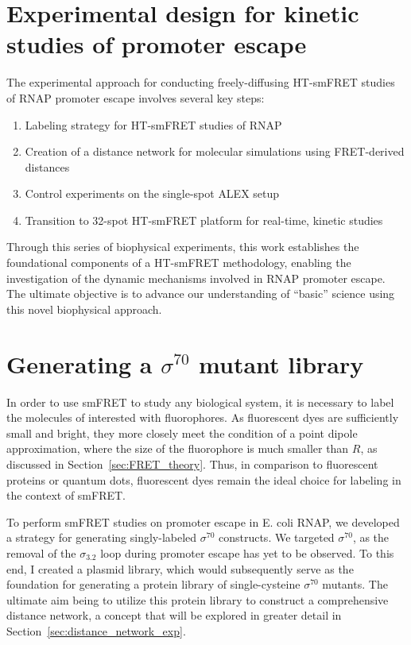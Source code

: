 \section{Experimental design for kinetic studies of promoter escape}
\label{sec:promoter_escape_exp}

The experimental approach for conducting freely-diffusing \ac{HT-smFRET} studies of \ac{RNAP} promoter escape involves several key steps:

\begin{enumerate}
    \item Labeling strategy for \ac{HT-smFRET} studies of \ac{RNAP}
    \item Creation of a distance network for molecular simulations using FRET-derived distances
    \item Control experiments on the single-spot \ac{ALEX} setup
    \item Transition to 32-spot \ac{HT-smFRET} platform for real-time, kinetic studies
\end{enumerate}

Through this series of biophysical experiments, this work establishes the foundational components of a \ac{HT-smFRET} methodology, enabling the investigation of the dynamic mechanisms involved in \ac{RNAP} promoter escape. 
The ultimate objective is to advance our understanding of \enquote{basic} science using this novel biophysical approach.

\section{Generating a $\sigma^{70}$ mutant library}
\label{sec:sigma70_library_exp}

In order to use \ac{smFRET} to study any biological system, it is necessary to label the molecules of interested with fluorophores.
As fluorescent dyes are sufficiently small and bright, they more closely meet the condition of a point dipole approximation, where the size of the fluorophore is much smaller than $R$, as discussed in Section~\ref{sec:FRET_theory}.
Thus, in comparison to fluorescent proteins or quantum dots, fluorescent dyes remain the ideal choice for labeling in the context of \ac{smFRET}.

To perform \ac{smFRET} studies on promoter escape in \ac{E. coli} \ac{RNAP}, we developed a strategy for generating singly-labeled $\sigma^{70}$ constructs. 
We targeted $\sigma^{70}$, as the removal of the $\sigma_{3.2}$ loop during promoter escape has yet to be observed. 
To this end, I created a plasmid library, which would subsequently serve as the foundation for generating a protein library of single-cysteine $\sigma^{70}$ mutants. 
The ultimate aim being to utilize this protein library to construct a comprehensive distance network, a concept that will be explored in greater detail in Section~\ref{sec:distance_network_exp}.

